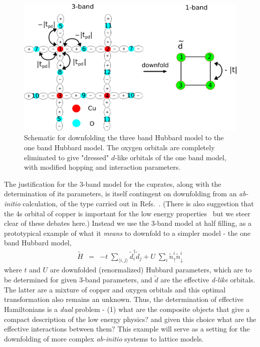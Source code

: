 \documentclass[prl,12pt,onecolumn,nofootinbib,notitlepage,english,superscriptaddress]{revtex4-1}
\begin{document}
\begin{figure}[htpb]
\centering
\includegraphics[width=1\linewidth]{./three_band_figure.pdf}
\caption{Schematic for downfolding the three band Hubbard model to the one band Hubbard model. 
The oxygen orbitals are completely eliminated to give "dressed" $d$-like orbitals of the one band model, with modified hopping 
and interaction parameters.}
\label{fig:threeband} 
\end{figure}	

The justification for the 3-band model for the cuprates, along with the determination of its parameters, 
is itself contingent on downfolding from an \emph{ab-initio} calculation, 
of the type carried out in Refs.~\cite{Wagner_Abbamonte}. (There is also suggestion that the 4s orbital of copper is important 
for the low energy properties~\cite{Pavirini} but we steer clear of these debates here.) 
Instead we use the 3-band model at half filling, as a prototypical example of what it \emph{means} to downfold to 
a simpler model - the one band Hubbard model, 
\begin{eqnarray}
	\tilde{H} &=&  -t \;\sum_{\langle i,j \rangle} \tilde{d}_i^{\dagger} \tilde{d}_j + U \;\sum_{i} \tilde{n}^{i}_{\uparrow} \tilde{n}^{i}_{\downarrow}
\label{eq:oneband}
\end{eqnarray}
where $t$ and $U$ are downfolded (renormalized) Hubbard parameters, which are to 
be determined for given 3-band parameters, and $\tilde{d}$ are the effective \emph{d-like} orbitals. 
The latter are a mixture of copper and oxygen orbitals and this optimal transformation also remains an unknown. Thus, 
the determination of effective Hamiltonians is a \emph{dual} problem - (1) what are the composite objects that give a 
compact description of the low energy physics? and given this choice what are the effective interactions between them?  
This example will serve as a setting for the downfolding of more complex \emph{ab-initio} systems to lattice 
models. 
\end{document}
